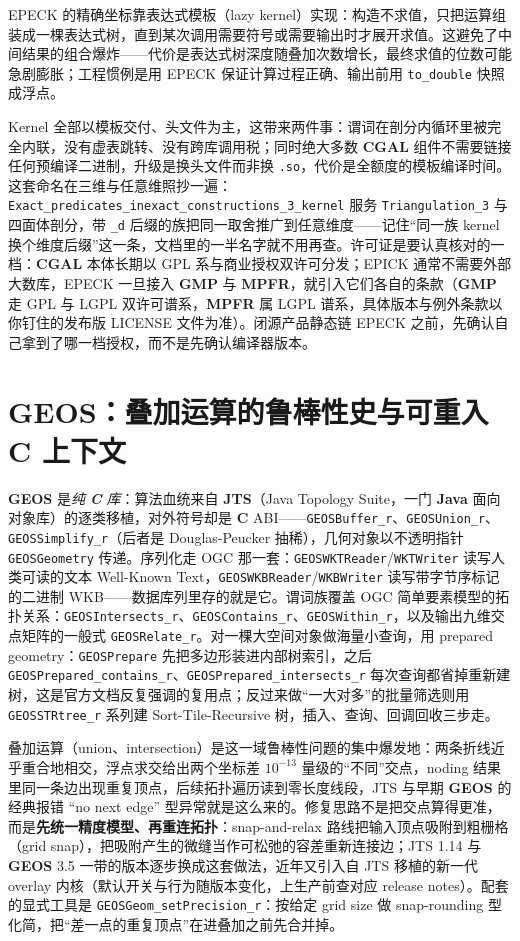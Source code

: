 \documentclass[12pt,a4paper,fontset=fandol]{ctexbook}
\newcommand{\Tp}[1]{\texttt{#1}}
\newcommand{\Bk}{\allowbreak}
\newcommand{\Lib}[1]{\textbf{#1}}
\newcommand{\Lang}[1]{\textsf{\bfseries #1}}
\newcommand{\CL}{\Lang{C}}
\begin{document}
EPECK 的精确坐标靠表达式模板（lazy kernel）实现：构造不求值，只把运算组装成一棵表达式树，直到某次调用需要符号或需要输出时才展开求值。这避免了中间结果的组合爆炸——代价是表达式树深度随叠加次数增长，最终求值的位数可能急剧膨胀；工程惯例是用 EPECK 保证计算过程正确、输出前用 \Tp{to\_double} 快照成浮点。

Kernel 全部以模板交付、头文件为主，这带来两件事：谓词在剖分内循环里被完全内联，没有虚表跳转、没有跨库调用税；同时绝大多数 \Lib{CGAL} 组件不需要链接任何预编译二进制，升级是换头文件而非换 \Tp{.so}，代价是全额度的模板编译时间。这套命名在三维与任意维照抄一遍：\Tp{Exact\_predicates\_inexact\_constructions\_3\_kernel} 服务 \Tp{Triangulation\_3} 与四面体剖分，带 \Tp{\_d} 后缀的族把同一取舍推广到任意维度——记住``同一族 kernel 换个维度后缀''这一条，文档里的一半名字就不用再查。许可证是要认真核对的一档：\Lib{CGAL} 本体长期以 GPL 系与商业授权双许可分发；EPICK 通常不需要外部大数库，EPECK 一旦接入 \Lib{GMP} 与 \Lib{MPFR}，就引入它们各自的条款（\Lib{GMP} 走 GPL 与 LGPL 双许可谱系，\Lib{MPFR} 属 LGPL 谱系，具体版本与例外条款以你钉住的发布版 LICENSE 文件为准）。闭源产品静态链 EPECK 之前，先确认自己拿到了哪一档授权，而不是先确认编译器版本。

\section{\Lib{GEOS}：叠加运算的鲁棒性史与可重入 \CL{} 上下文}

\Lib{GEOS} 是\emph{纯 \CL{} 库}：算法血统来自 \Lib{JTS}（Java Topology Suite，一门 \Lib{Java} 面向对象库）的逐类移植，对外符号却是 \CL{} ABI——\Tp{GEOSBuffer\_r}、\Tp{GEOSUnion\_r}、\Tp{GEOSSimplify\_r}（后者是 Douglas-Peucker 抽稀），几何对象以不透明指针 \Tp{GEOSGeometry} 传递。序列化走 OGC 那一套：\Tp{GEOSWKTReader}/{\Bk}\Tp{WKTWriter} 读写人类可读的文本 Well-Known Text，\Tp{GEOSWKBReader}/{\Bk}\Tp{WKBWriter} 读写带字节序标记的二进制 WKB——数据库列里存的就是它。谓词族覆盖 OGC 简单要素模型的拓扑关系：\Tp{GEOSIntersects\_r}、\Tp{GEOSContains\_r}、\Tp{GEOSWithin\_r}，以及输出九维交点矩阵的一般式 \Tp{GEOSRelate\_r}。对一棵大空间对象做海量小查询，用 prepared geometry：\Tp{GEOSPrepare} 先把多边形装进内部树索引，之后 \Tp{GEOSPrepared\allowbreak\_contains\_r}、\Tp{GEOSPrepared\allowbreak\_intersects\_r} 每次查询都省掉重新建树，这是官方文档反复强调的复用点；反过来做``一大对多''的批量筛选则用 \Tp{GEOSSTRtree\_r} 系列建 Sort-Tile-Recursive 树，插入、查询、回调回收三步走。

叠加运算（union、intersection）是这一域鲁棒性问题的集中爆发地：两条折线近乎重合地相交，浮点求交给出两个坐标差 $10^{-13}$ 量级的``不同''交点，noding 结果里同一条边出现重复顶点，后续拓扑遍历读到零长度线段，JTS 与早期 \Lib{GEOS} 的经典报错 ``no next edge'' 型异常就是这么来的。修复思路不是把交点算得更准，而是\textbf{先统一精度模型、再重连拓扑}：snap-and-relax 路线把输入顶点吸附到粗栅格（grid snap），把吸附产生的微缝当作可松弛的容差重新连接边；JTS 1.14 与 \Lib{GEOS} 3.5 一带的版本逐步换成这套做法，近年又引入自 JTS 移植的新一代 overlay 内核（默认开关与行为随版本变化，上生产前查对应 release notes）。配套的显式工具是 \Tp{GEOSGeom\_setPrecision\_r}：按给定 grid size 做 snap-rounding 型化简，把``差一点的重复顶点''在进叠加之前先合并掉。
\end{document}
